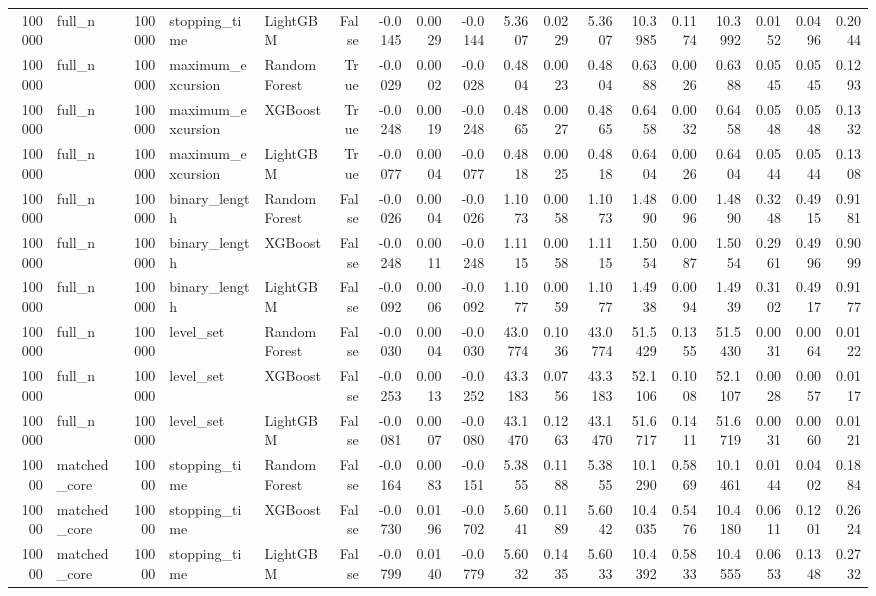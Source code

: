\begin{table}
\begin{tabular}{rlrllrrrrrrrrrrrrr}
100000 & full_n & 100000 & stopping_time & LightGBM & False & -0.0145 & 0.0029 & -0.0144 & 5.3607 & 0.0229 & 5.3607 & 10.3985 & 0.1174 & 10.3992 & 0.0152 & 0.0496 & 0.2044 \\
100000 & full_n & 100000 & maximum_excursion & RandomForest & True & -0.0029 & 0.0002 & -0.0028 & 0.4804 & 0.0023 & 0.4804 & 0.6388 & 0.0026 & 0.6388 & 0.0545 & 0.0545 & 0.1293 \\
100000 & full_n & 100000 & maximum_excursion & XGBoost & True & -0.0248 & 0.0019 & -0.0248 & 0.4865 & 0.0027 & 0.4865 & 0.6458 & 0.0032 & 0.6458 & 0.0548 & 0.0548 & 0.1332 \\
100000 & full_n & 100000 & maximum_excursion & LightGBM & True & -0.0077 & 0.0004 & -0.0077 & 0.4818 & 0.0025 & 0.4818 & 0.6404 & 0.0026 & 0.6404 & 0.0544 & 0.0544 & 0.1308 \\
100000 & full_n & 100000 & binary_length & RandomForest & False & -0.0026 & 0.0004 & -0.0026 & 1.1073 & 0.0058 & 1.1073 & 1.4890 & 0.0096 & 1.4890 & 0.3248 & 0.4915 & 0.9181 \\
100000 & full_n & 100000 & binary_length & XGBoost & False & -0.0248 & 0.0011 & -0.0248 & 1.1115 & 0.0058 & 1.1115 & 1.5054 & 0.0087 & 1.5054 & 0.2961 & 0.4996 & 0.9099 \\
100000 & full_n & 100000 & binary_length & LightGBM & False & -0.0092 & 0.0006 & -0.0092 & 1.1077 & 0.0059 & 1.1077 & 1.4938 & 0.0094 & 1.4939 & 0.3102 & 0.4917 & 0.9177 \\
100000 & full_n & 100000 & level_set & RandomForest & False & -0.0030 & 0.0004 & -0.0030 & 43.0774 & 0.1036 & 43.0774 & 51.5429 & 0.1355 & 51.5430 & 0.0031 & 0.0064 & 0.0122 \\
100000 & full_n & 100000 & level_set & XGBoost & False & -0.0253 & 0.0013 & -0.0252 & 43.3183 & 0.0756 & 43.3183 & 52.1106 & 0.1008 & 52.1107 & 0.0028 & 0.0057 & 0.0117 \\
100000 & full_n & 100000 & level_set & LightGBM & False & -0.0081 & 0.0007 & -0.0080 & 43.1470 & 0.1263 & 43.1470 & 51.6717 & 0.1411 & 51.6719 & 0.0031 & 0.0060 & 0.0121 \\
10000 & matched_core & 10000 & stopping_time & RandomForest & False & -0.0164 & 0.0083 & -0.0151 & 5.3855 & 0.1188 & 5.3855 & 10.1290 & 0.5869 & 10.1461 & 0.0144 & 0.0402 & 0.1884 \\
10000 & matched_core & 10000 & stopping_time & XGBoost & False & -0.0730 & 0.0196 & -0.0702 & 5.6041 & 0.1189 & 5.6042 & 10.4035 & 0.5476 & 10.4180 & 0.0611 & 0.1201 & 0.2624 \\
10000 & matched_core & 10000 & stopping_time & LightGBM & False & -0.0799 & 0.0140 & -0.0779 & 5.6032 & 0.1435 & 5.6033 & 10.4392 & 0.5833 & 10.4555 & 0.0653 & 0.1348 & 0.2732 \\

\end{tabular}
\end{table}
